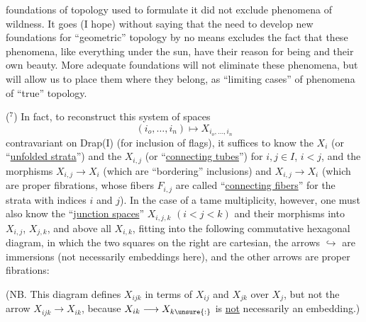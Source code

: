 
foundations of topology used to formulate it did not exclude
phenomena of wildness. It goes (I hope) without saying
that the need to develop new foundations for
``geometric'' topology by no means excludes the fact that these phenomena,
like everything under the sun, have their reason for being
and their own beauty. More adequate foundations will not eliminate
these phenomena, but will allow us to place them where they
belong, as ``limiting cases'' of phenomena of ``true''
topology.

($^7$) In fact, to reconstruct this system of spaces
\[ (i_o,\ldots,i_n) \longmapsto X_{i_o,\ldots,i_n} \]
contravariant on Drap(I) (for inclusion of flags), it
suffices to know the $X_i$ (or ``\uline{unfolded strata}'') and the $X_{i,j}$
(or ``\uline{connecting tubes}'') for $i,j \in I$, $i < j$, and the morphisms
$X_{i,j} \longrightarrow X_i$ (which are ``bordering'' inclusions) and $X_{i,j} \rightarrow X_i$
(which are proper fibrations, whose fibers $F_{i,j}$ are
called ``\uline{connecting fibers}'' for the strata with indices $i$ and $j$).
In the case of a tame multiplicity, however, one must
also know the ``\uline{junction spaces}'' $X_{i,j,k}$ $(i < j < k)$ and their
morphisms into $X_{i,j}$, $X_{j,k}$, and above all $X_{i,k}$, fitting into
the following commutative hexagonal diagram, in which the two squares on
the right are cartesian, the arrows $\hookrightarrow$ are immersions (not
necessarily embeddings here), and the other arrows are
proper fibrations:


(NB. This diagram defines $X_{ijk}$ in terms of $X_{ij}$ and $X_{jk}$ over $X_j$,
but not the arrow $X_{ijk} \longrightarrow X_{ik}$, because $X_{ik} \longrightarrow X_{k\unsure{:}}$ is \uline{not} necessarily
an embedding.)


